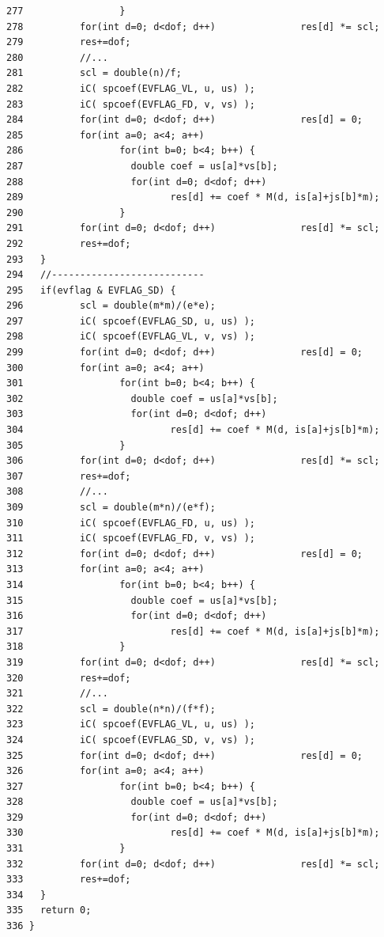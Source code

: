 \begin{verbatim}
277                 }
278          for(int d=0; d<dof; d++)               res[d] *= scl;
279          res+=dof;
280          //...
281          scl = double(n)/f;
282          iC( spcoef(EVFLAG_VL, u, us) );
283          iC( spcoef(EVFLAG_FD, v, vs) );
284          for(int d=0; d<dof; d++)               res[d] = 0;
285          for(int a=0; a<4; a++)
286                 for(int b=0; b<4; b++) {
287                   double coef = us[a]*vs[b]; 
288                   for(int d=0; d<dof; d++)
289                          res[d] += coef * M(d, is[a]+js[b]*m);
290                 }
291          for(int d=0; d<dof; d++)               res[d] *= scl;
292          res+=dof;
293   }
294   //---------------------------
295   if(evflag & EVFLAG_SD) {
296          scl = double(m*m)/(e*e);
297          iC( spcoef(EVFLAG_SD, u, us) );
298          iC( spcoef(EVFLAG_VL, v, vs) );
299          for(int d=0; d<dof; d++)               res[d] = 0;
300          for(int a=0; a<4; a++)
301                 for(int b=0; b<4; b++) {
302                   double coef = us[a]*vs[b]; 
303                   for(int d=0; d<dof; d++)
304                          res[d] += coef * M(d, is[a]+js[b]*m);
305                 }
306          for(int d=0; d<dof; d++)               res[d] *= scl;
307          res+=dof;
308          //...
309          scl = double(m*n)/(e*f);
310          iC( spcoef(EVFLAG_FD, u, us) );
311          iC( spcoef(EVFLAG_FD, v, vs) );
312          for(int d=0; d<dof; d++)               res[d] = 0;
313          for(int a=0; a<4; a++)
314                 for(int b=0; b<4; b++) {
315                   double coef = us[a]*vs[b]; 
316                   for(int d=0; d<dof; d++)
317                          res[d] += coef * M(d, is[a]+js[b]*m);
318                 }
319          for(int d=0; d<dof; d++)               res[d] *= scl;
320          res+=dof;
321          //...
322          scl = double(n*n)/(f*f);
323          iC( spcoef(EVFLAG_VL, u, us) );
324          iC( spcoef(EVFLAG_SD, v, vs) );
325          for(int d=0; d<dof; d++)               res[d] = 0;
326          for(int a=0; a<4; a++)
327                 for(int b=0; b<4; b++) {
328                   double coef = us[a]*vs[b]; 
329                   for(int d=0; d<dof; d++)
330                          res[d] += coef * M(d, is[a]+js[b]*m);
331                 }
332          for(int d=0; d<dof; d++)               res[d] *= scl;
333          res+=dof;
334   }
335   return 0;
336 }
\end{verbatim}\normalsize 



